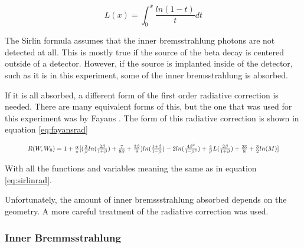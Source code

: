 \documentclass[main.tex]{subfiles}
\begin{document}
\begin{equation}
	L(x) = \int_{0}^{x} \frac{ln(1 - t)}{t}dt
	\label{eq:spence}
\end{equation}

The Sirlin formula assumes that the inner bremsstrahlung photons are not detected at all.
This is mostly true if the source of the beta decay is centered outside of a detector.
However, if the source is implanted inside of the detector, such as it is in this experiment, some of the inner bremsstrahlung is absorbed.

If it is all absorbed, a different form of the first order radiative correction is needed.
There are many equivalent forms of this, but the one that was used for this experiment was by Fayans \cite{Fay86}.
The form of this radiative correction is shown in equation \ref{eq:fayansrad}

\begin{equation}	
	\resizebox{.9\textwidth}{!}
	{
	$R(W,W_{0}) = 1 + \frac{\alpha}{\pi}[(\frac{2}{\beta}ln(\frac{2\beta}{1+\beta}) + \frac{7}{8\beta} + \frac{3\beta}{8})ln(\frac{1 + \beta}{1 - \beta}) - 2ln(\frac{4\beta^{2}}{1 - \beta^{2}}) + \frac{4}{\beta}L(\frac{2\beta}{1+\beta}) + \frac{23}{8} + \frac{3}{2}ln(M)]$
	}
	\label{eq:fayansrad}
\end{equation}

With all the functions and variables meaning the same as in equation \ref{eq:sirlinrad}.

Unfortunately, the amount of inner bremssstrahlung absorbed depends on the geometry.
A more careful treatment of the radiative correction was used.

\subsubsection{Inner Bremmsstrahlung}
\end{document}
